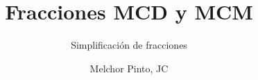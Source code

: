 \documentclass{guia}
\title{Fracciones MCD y MCM}
\subtitle{Simplificación de fracciones}
\author{Melchor Pinto, JC}
\begin{document}
%
\begin{questions}
\questionboxed{}
\end{questions}
\end{document}
